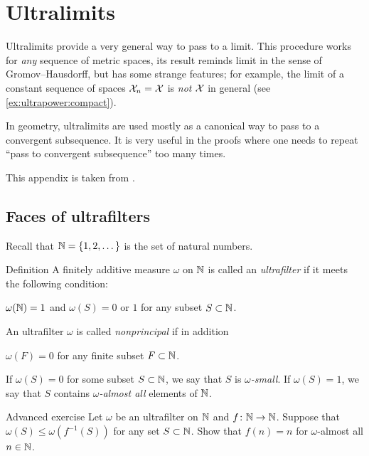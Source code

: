 \chapter{Ultralimits}\label{chap:ultralimits}

Ultralimits provide a very general way to pass to a limit.
This procedure works for \textit{any} sequence of metric spaces, its result reminds limit in the sense of Gromov--Hausdorff, but has some strange features; for example, the limit of a constant sequence of spaces $\mathcal{X}_n=\mathcal{X}$ is \textit{not} $\mathcal{X}$ in general (see \ref{ex:ultrapower:compact}).

In geometry, ultralimits are used mostly as a canonical way to pass to a convergent subsequence.
It is very useful in the proofs where one needs to repeat ``pass to convergent subsequence'' too many times.

This appendix is taken from \cite{petrunin2023pure}.

\section{Faces of ultrafilters}

Recall that $\mathbb{N}=\{1,2,\dots\}$ is the set of natural numbers.

\begin{thm}{Definition}
A finitely additive measure $\omega$ 
on $\mathbb{N}$ 
is called an \emph{ultrafilter} if it meets the following condition:
\begin{subthm}{}
$\omega(\mathbb{N})=1$ and 
$\omega(S)=0$ or $1$ for any subset $S\subset \mathbb{N}$.
\end{subthm}
An ultrafilter $\omega$ is called 
\emph{nonprincipal} if in addition 
\begin{subthm}{}
$\omega(F)=0$ for any finite subset $F\subset \mathbb{N}$.
\end{subthm}
\end{thm}

If $\omega(S)=0$ for some subset $S\subset \mathbb{N}$,
we say that $S$ is \emph{$\omega$-small}. 
If $\omega(S)=1$, we say that $S$ contains \emph{$\omega$-almost all} elements of $\mathbb{N}$.

\begin{thm}{Advanced exercise}\label{ex:ultrakatetov}
Let $\omega$ be an ultrafilter on $\mathbb{N}$ and $f\:\NN\z\to \NN$.
Suppose that $\omega(S)\le \omega(f^{-1}(S))$ for any set $S\subset \mathbb{N}$.
Show that $f(n)=n$ for $\omega$-almost all $n\in\mathbb{N}$.
\end{thm}


